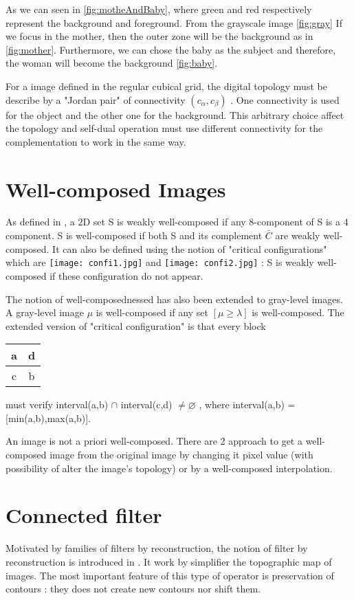 \par
As we can seen in \ref{fig:motheAndBaby}, where green and red respectively represent the background and foreground. From the grayscale image \ref{fig:gray} If we focus in the mother, then the outer zone will be the background as in \ref{fig:mother}. Furthermore, we can chose the baby as the subject and therefore, the woman will become the background \ref{fig:baby}.	
\par
For a image defined in the regular cubical grid, the digital topology must be describe by a "Jordan pair" of connectivity $(c_\alpha,c_\beta)$ \cite{Kong:1989:DTI:71397.71400}. One connectivity is used for the object and the other one for the background. This arbitrary choice affect the topology and self-dual operation must use different connectivity for the complementation to work in the same way.




\section{Well-composed Images}
\par
As defined in \cite{Latecki95}, a 2D set S is weakly well-composed if any 8-component of S is a 4 component. S is well-composed if both S and its complement $\bar{C}$ are weakly well-composed. It can also be defined using the notion of "critical configurations" which are \texttt{[image: confi1.jpg]} and \texttt{[image: confi2.jpg]} : S is weakly well-composed if these configuration do not appear.
\par
The notion of well-composednessed has also been extended to gray-level images. A gray-level image $\mu$ is well-composed if any set $[\mu \geq \lambda ]$ is well-composed. The extended version of "critical configuration" is that every block 
\begin{tabular}{|c|c|}
\hline 
a & d \\ 
\hline 
c & b \\ 
\hline 
\end{tabular} 
must verify interval(a,b) $\cap$ interval(c,d) $\neq \varnothing$ , where interval(a,b) = [min(a,b),max(a,b)].
\par
An image is not a priori well-composed. There are 2 approach to get a well-composed image from the original image \cite{Geraud.15.ismm} by changing it pixel value (with possibility of alter the image's topology) or by a well-composed interpolation.



\section{Connected filter}
Motivated by families of filters by reconstruction, the notion of filter by reconstruction is introduced in \cite{Salembier95flatzones} \cite{Serra1993}. It work by simplifier the topographic map of images. The most important feature of this type of operator is preservation of contours \cite{Salembier2009}: they does not create new contours nor shift them.
